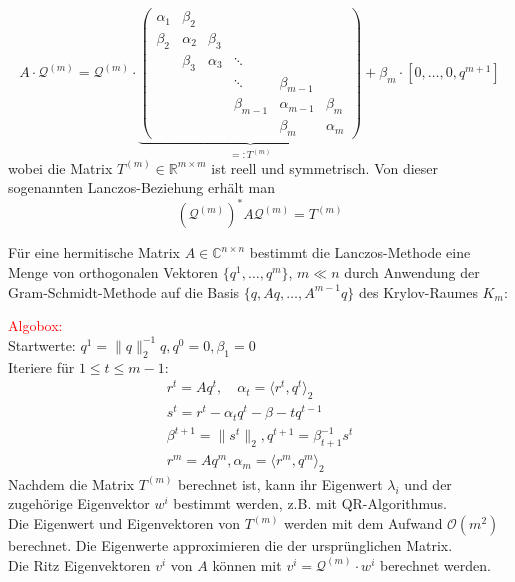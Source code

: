 \[A\cdot \mathcal{Q}^{(m)} = \mathcal{Q}^{(m)}\cdot\underbrace{\begin{pmatrix}
    \alpha_1 & \beta_2 & & & & \\
    \beta_2 & \alpha_2 & \beta_3 & & & \\
    & \beta_3 & \alpha_3 & \ddots & & \\
    & & & \ddots & \beta_{m-1} & \\
    & & & \beta_{m-1} & \alpha_{m-1} & \beta_m \\
    & & & & \beta_m & \alpha_m
\end{pmatrix}}_{=:T^{(m)}} + \beta_m\cdot[0,\dots,0,q^{m+1}]\]
wobei die Matrix $T^{(m)}\in\mathbb{R}^{m\times m}$ ist reell und symmetrisch. Von dieser sogenannten Lanczos-Beziehung
erhält man 
\[(\mathcal{Q}^{(m)})^* A \mathcal{Q}^{(m)} = T^{(m)}\] 
\begin{defbox}
    Für eine hermitische Matrix $A\in\mathbb{C}^{n\times n}$ bestimmt die Lanczos-Methode eine Menge von orthogonalen 
    Vektoren $\{q^1,\dots,q^m\}$, $m\ll n$ durch Anwendung der Gram-Schmidt-Methode auf die Basis 
    $\{q,Aq,\dotsc,A^{m-1}q\}$ des Krylov-Raumes $K_m$:
\end{defbox}
\textcolor{red}{Algobox:} \\
Startwerte: $q^1=\|q\|_2^{-1}q, q^0=0, \beta_1=0$ \\
Iteriere für $1\leq t\leq m-1$:
\begin{align*}
    r^t = Aq^t, \quad \alpha_t = \langle r^t, q^t\rangle_2 \\
    s^t = r^t - \alpha_t q^t - \beta-tq^{t-1} \\
    \beta^{t+1} = \|s^t\|_2, q^{t+1} = \beta_{t+1}^{-1}s^t \\
    r^m = Aq^m, \alpha_m = \langle r^m,q^m\rangle_2
\end{align*}
Nachdem die Matrix $T^{(m)}$ berechnet ist, kann ihr Eigenwert $\lambda_i$ und der zugehörige Eigenvektor $w^{i}$
bestimmt werden, z.B. mit QR-Algorithmus. \\
Die Eigenwert und Eigenvektoren von $T^{(m)}$ werden mit dem Aufwand $\mathcal{O}(m^2)$ berechnet. Die Eigenwerte 
approximieren die der ursprünglichen Matrix. \\
Die Ritz Eigenvektoren $v^i$ von $A$ können mit $v^i=\mathcal{Q}^{(m)}\cdot w^i$ berechnet werden.


